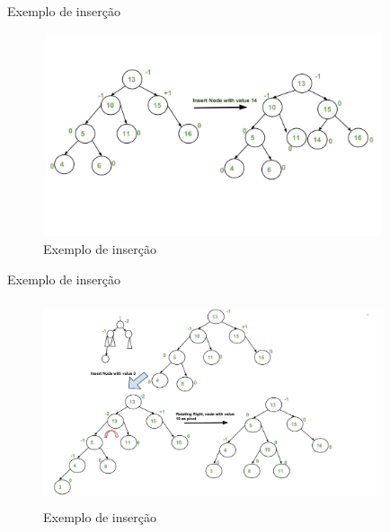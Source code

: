 \begin{frame}
	\begin{block}{Exemplo de inserção}
		\begin{figure}[!htb]
			\centering	  				
			\includegraphics[height=6cm, width = 10cm]{./pic/AVL_exemplo_04.jpg}
			\caption{Exemplo de inserção  \cite{GEEKS_2018}}
		\end{figure}
	\end{block}
\end{frame}

\begin{frame}
	\begin{block}{Exemplo de inserção}
		\begin{figure}[!htb]
			\centering	  				
			\includegraphics[height=6cm, width = 10cm]{./pic/AVL_exemplo_05.jpg}
			\caption{Exemplo de inserção  \cite{GEEKS_2018}}
		\end{figure}
	\end{block}
\end{frame}

